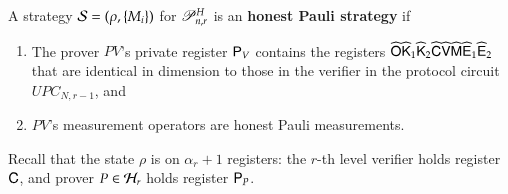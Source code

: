 A strategy $\mathcal{S} = (\rho,\{M_i\})$ for $\mathscr{P}_{n,r}^H$ is an \textbf{honest Pauli strategy} if
\begin{enumerate}
	\item The prover $PV$'s private register ${\mathsf{P}}_V$ contains the registers $\widehat{{\mathsf{O}}} \widehat{{\mathsf{K}}}_1 \widehat{{\mathsf{K}}}_2 \widehat{{\mathsf{C}}} \widehat{{\mathsf{V}}} \widehat{{\mathsf{M}}} \widehat{{\mathsf{E}}}_1 \widehat{{\mathsf{E}}}_2$ that are identical in dimension to those in the verifier in the protocol circuit $UPC_{N,r-1}$, and
	\item $PV$'s measurement operators are honest Pauli measurements.
\end{enumerate}
Recall that the state $\rho$ is on $\alpha_r + 1$ registers: the $r$-th level verifier holds register ${\mathsf{C}}$, and prover $P \in \mathcal H_r$ holds register ${\mathsf{P}}_P$.



